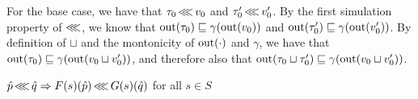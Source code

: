 For the base case, we have that $\tau_{0} \operatorname{\lll} v_{0}$ and $\tau_{0}' \operatorname{\lll} v_{0}'$. By the first simulation property of $\operatorname{\lll}$, we know that $\operatorname{out}(\tau_{0}) \sqsubseteq \gamma(\operatorname{out}(v_{0}))$ and $\operatorname{out}(\tau_{0}') \sqsubseteq \gamma(\operatorname{out}(v_{0}'))$. By definition of $\sqcup$ and the montonicity of $\operatorname{out}(\cdot)$ and $\gamma$, we have that $\operatorname{out}(\tau_{0}) \sqsubseteq \gamma(\operatorname{out}(v_{0} \sqcup v_{0}'))$, and therefore also that $\operatorname{out}(\tau_{0} \sqcup \tau_{0}') \sqsubseteq \gamma(\operatorname{out}(v_{0} \sqcup v_{0}'))$.




\begin{lemma}
$\hat p \operatorname{\lll} \hat q \Rightarrow F(s)(\hat p) \operatorname{\lll} G(s)(\hat q)$ for all $s \in S$
\end{lemma}


